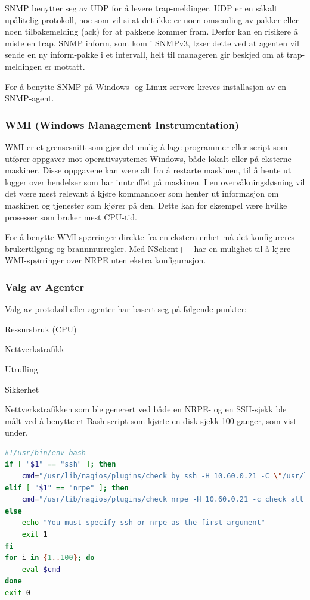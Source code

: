 SNMP benytter seg av UDP for å levere trap-meldinger. UDP er en såkalt upålitelig protokoll, noe som vil si at det ikke er noen omsending av pakker eller noen tilbakemelding (ack) for at pakkene kommer fram. Derfor kan en risikere å miste en trap. SNMP inform, som kom i SNMPv3, løser dette ved at agenten vil sende en ny inform-pakke i et intervall, helt til manageren gir beskjed om at trap-meldingen er mottatt.

For å benytte SNMP på Windows- og Linux-servere kreves installasjon av en SNMP-agent\cite{mssnmp,netsnmp}.

\subsubsection{WMI (Windows Management Instrumentation)}
WMI er et grensesnitt som gjør det mulig å lage programmer eller script som utfører oppgaver mot operativsystemet Windows, både lokalt eller på eksterne maskiner. Disse oppgavene kan være alt fra å restarte maskinen, til å hente ut logger over hendelser som har inntruffet på maskinen. I en overvåkningsløsning vil det være mest relevant å kjøre kommandoer som henter ut informasjon om maskinen og tjenester som kjører på den. Dette kan for eksempel være hvilke prosesser som bruker mest CPU-tid.

For å benytte WMI-spørringer direkte fra en ekstern enhet må det konfigureres brukertilgang og brannmurregler\cite{wmiremote}. Med NSclient++ har en mulighet til å kjøre WMI-spørringer over NRPE uten ekstra konfigurasjon.

\subsubsection{Valg av Agenter}
Valg av protokoll eller agenter har basert seg på følgende punkter:
\begin{itemize*}
	\item Ressursbruk (CPU)
	\item Nettverkstrafikk
	\item Utrulling
	\item Sikkerhet
\end{itemize*}
Nettverkstrafikken som ble generert ved både en NRPE- og en SSH-sjekk ble målt ved å benytte et Bash-script som kjørte en disk-sjekk 100 ganger, som vist under. 

\begin{lstlisting}[style=example,language=bash]
#!/usr/bin/env bash
if [ "$1" == "ssh" ]; then
    cmd="/usr/lib/nagios/plugins/check_by_ssh -H 10.60.0.21 -C \"/usr/lib/nagios/plugins/check_disk -W 10% -C 5% -M -A\" > /dev/null"
elif [ "$1" == "nrpe" ]; then
    cmd="/usr/lib/nagios/plugins/check_nrpe -H 10.60.0.21 -c check_all_mounts -a 10,5 > /dev/null"
else
    echo "You must specify ssh or nrpe as the first argument"
    exit 1
fi
for i in {1..100}; do
    eval $cmd
done
exit 0
\end{lstlisting}


